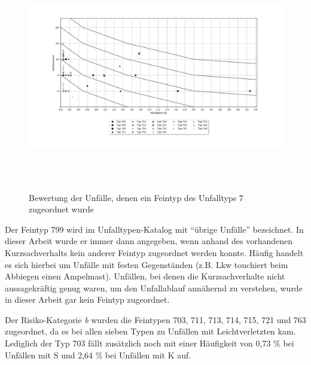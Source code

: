 \begin{savenotes}
	\begin{figure}[H]
		\centering
		\includegraphics[width=18cm,height=10cm]{figures/Bewertung_FT7}
		\caption[Bewertung der Unfälle, denen ein Feintyp des Unfalltyps 7 zugeordnet wurde]{Bewertung der Unfälle, denen ein Feintyp des Unfalltyps 7 zugeordnet wurde}\label{fig:Bewertung_FT7}
	\end{figure}
\end{savenotes}

Der Feintyp 799 wird im Unfalltypen-Katalog mit \enquote{übrige Unfälle} bezeichnet. In dieser Arbeit wurde er immer dann angegeben, wenn anhand des vorhandenen Kurzsachverhalts kein anderer Feintyp zugeordnet werden konnte. Häufig handelt es sich hierbei um Unfälle mit festen Gegenständen (z.B. Lkw touchiert beim Abbiegen einen Ampelmast). Unfällen, bei denen die Kurzsachverhalte nicht aussagekräftig genug waren, um den Unfallablauf annähernd zu verstehen, wurde in dieser Arbeit gar kein Feintyp zugeordnet.   

Der Risiko-Kategorie \textit{b} wurden die Feintypen 703, 711, 713, 714, 715, 721 und 763 zugeordnet, da es bei allen sieben Typen zu Unfällen mit Leichtverletzten kam. Lediglich der Typ 703 fällt zusätzlich noch mit einer Häufigkeit von 0,73 \% bei Unfällen mit \ac{S} und 2,64 \% bei Unfällen mit \ac{K} auf.

